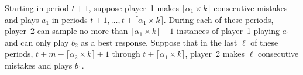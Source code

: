 \documentclass[11.5pt]{article}
\begin{document}

Starting in period $t+1$, suppose player~1 makes $\lceil \alpha_1 \times k \rceil$ consecutive mistakes and plays $a_1$ in periods $t+1, \dots, t+\lceil \alpha_1 \times k \rceil$. During each of these periods,  player~2 can sample no more than $\lceil \alpha_1 \times k \rceil - 1$ instances of player~1 playing $a_1$ and can only play $b_2$ as a best response. 
%
Suppose that in the last $\ell$ of these periods, $t+m-\lceil \alpha_2 \times k \rceil +1$ through $t+\lceil \alpha_1 \times k \rceil$,  player~2 makes $\ell$ consecutive mistakes and plays $b_1$. 
\end{document}
